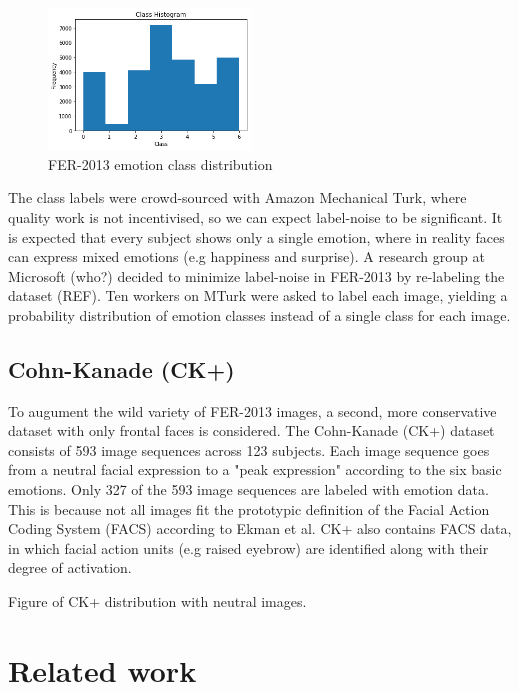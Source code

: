 \documentclass[twoside]{article}
\begin{document}
\begin{multicols}{2}
\begin{figure}[H]
	\includegraphics[width=0.48\textwidth]{class_dist}
	\caption{FER-2013 emotion class distribution}
\end{figure}

The class labels were crowd-sourced with Amazon Mechanical Turk, where quality work is not incentivised, so we can expect label-noise to be significant. It is expected that every subject shows only a single emotion, where in reality faces can express mixed emotions (e.g happiness and surprise). A research group at Microsoft (who?) decided to minimize label-noise in FER-2013 by re-labeling the dataset (REF). Ten workers on MTurk were asked to label each image, yielding a probability distribution of emotion classes instead of a single class for each image.




\subsection{Cohn-Kanade (CK+)}
To augument the wild variety of FER-2013 images, a second, more conservative dataset with only frontal faces is considered. The Cohn-Kanade (CK+) dataset consists of 593 image sequences across 123 subjects. Each image sequence goes from a neutral facial expression to a "peak expression" according to the six basic emotions. Only 327 of the 593 image sequences are labeled with emotion data. This is because not all images fit the prototypic definition of the Facial Action Coding System (FACS) according to Ekman et al. CK+ also contains FACS data, in which facial action units (e.g raised eyebrow) are identified along with their degree of activation.

Figure of CK+ distribution with neutral images.


\section{Related work}



\end{multicols}
\end{document}
